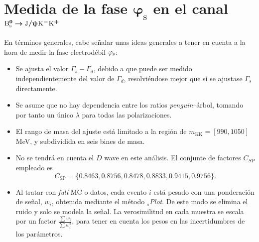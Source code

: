 \chapter[Medida de la fase $\varphi_s$ en el canal $\Bs \rightarrow \Jpsi \kaon \antikaon$]{Medida de la fase $\bm{\varphi_{\mathrm{s}}}$ en el canal $\bm{\text{B}{}_{\text{s}}^{0} \rightarrow \text{J}/\uppsi \text{K}{}^{-} \text{K}{}^{+}}$}
\label{cha:ana}


En términos generales, cabe señalar unas ideas generales a tener en cuenta a la hora de medir la fase electrodébil $\varphi_{\text{s}}$:
\begin{itemize}
  \item Se ajusta el valor $\Gamma_s - \Gamma_d$, debido a que puede ser medido independientemente del valor de $\Gamma_d$, resolviéndose mejor que si se ajustase $\Gamma_s$ directamente.
  \item Se asume que no hay dependencia entre los ratios \textit{penguin}--árbol, tomando por tanto un único $\lambda$ para todas las polarizaciones.
  \item El rango de masa del ajuste está limitado a la región de $m_{\text{KK}} = [990,1050]$ MeV, y subdividida en seis bines de masa.
  \item No se tendrá en cuenta el $D$ wave en este análisis. El conjunte de factores $C_{SP}$ empleado es $$ C_{\text{SP}}  = \{0.8463,0.8756,0.8478,0.8833,0.9415,0.9756\}.$$
  \item Al tratar con \emph{full} MC o datos, cada evento $i$ está pesado con una ponderación de señal, $w_i$, obtenida mediante el método ${}_s$\textit{Plot}. De este modo se elimina el ruido y solo se modela la señal. La verosimilitud en cada muestra se escala por un factor $\frac{\sum w_i}{\sum w_i^2}$, para tener en cuenta los pesos en las incertidumbres de los parámetros.
\end{itemize}





